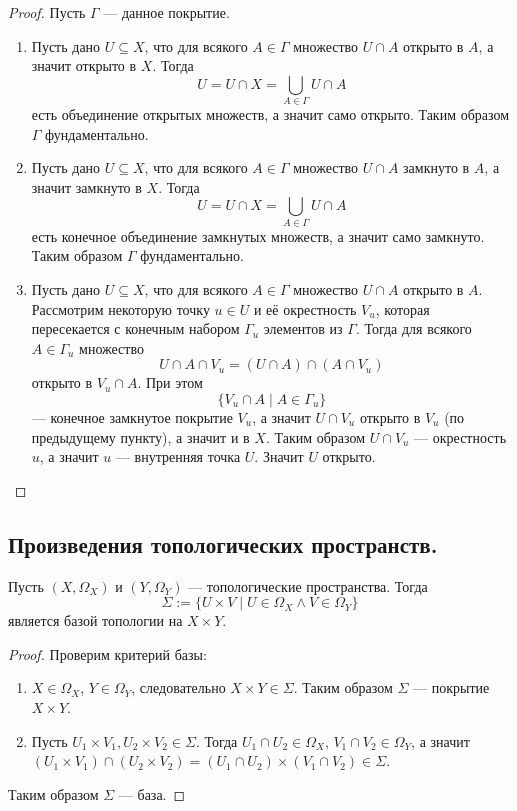 \documentclass[12pt,a4paper]{article}
\begin{document}
    \begin{proof}
        Пусть $\Gamma$ --- данное покрытие.
        \begin{enumerate}
            \item Пусть дано $U \subseteq X$, что для всякого $A \in \Gamma$ множество $U \cap A$ открыто в $A$, а значит открыто в $X$. Тогда
                \[U = U \cap X = \bigcup_{A \in \Gamma} U \cap A\]
                есть объединение открытых множеств, а значит само открыто. Таким образом $\Gamma$ фундаментально.

            \item Пусть дано $U \subseteq X$, что для всякого $A \in \Gamma$ множество $U \cap A$ замкнуто в $A$, а значит замкнуто в $X$. Тогда
                \[U = U \cap X = \bigcup_{A \in \Gamma} U \cap A\]
                есть конечное объединение замкнутых множеств, а значит само замкнуто. Таким образом $\Gamma$ фундаментально.

            \item Пусть дано $U \subseteq X$, что для всякого $A \in \Gamma$ множество $U \cap A$ открыто в $A$. Рассмотрим некоторую точку $u \in U$ и её окрестность $V_u$, которая пересекается с конечным набором $\Gamma_u$ элементов из $\Gamma$. Тогда для всякого $A \in \Gamma_u$ множество
                \[U \cap A \cap V_u = (U \cap A) \cap (A \cap V_u)\]
                открыто в $V_u \cap A$. При этом
                \[\{V_u \cap A \mid A \in \Gamma_u\}\]
                --- конечное замкнутое покрытие $V_u$, а значит $U \cap V_u$ открыто в $V_u$ (по предыдущему пункту), а значит и в $X$. Таким образом $U \cap V_u$ --- окрестность $u$, а значит $u$ --- внутренняя точка $U$. Значит $U$ открыто.
        \end{enumerate}
    \end{proof}

    \subsection{Произведения топологических пространств.}

    \begin{theorem}
        Пусть $(X, \Omega_X)$ и $(Y, \Omega_Y)$ --- топологические пространства. Тогда
        \[\Sigma := \{U \times V \mid U \in \Omega_X \wedge V \in \Omega_Y\}\]
        является базой топологии на $X \times Y$.
    \end{theorem}

    \begin{proof}
        Проверим критерий базы:
        \begin{enumerate}
            \item $X \in \Omega_X$, $Y \in \Omega_Y$, следовательно $X \times Y \in \Sigma$. Таким образом $\Sigma$ --- покрытие $X \times Y$.
            \item Пусть $U_1 \times V_1, U_2 \times V_2 \in \Sigma$. Тогда $U_1 \cap U_2 \in \Omega_X$, $V_1 \cap V_2 \in \Omega_Y$, а значит $(U_1 \times V_1) \cap (U_2 \times V_2) = (U_1 \cap U_2) \times (V_1 \cap V_2) \in \Sigma$.
        \end{enumerate}
        Таким образом $\Sigma$ --- база.
    \end{proof}
\end{document}
